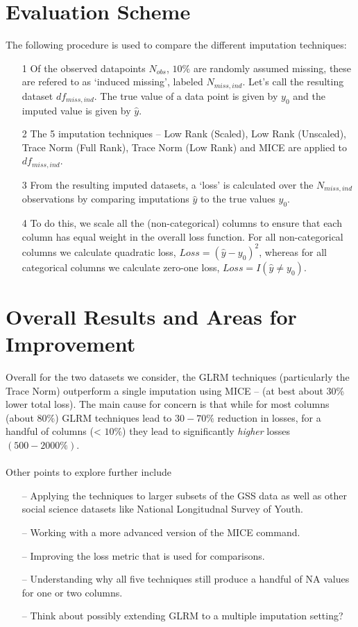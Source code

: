 \documentclass[11pt]{article} %
\begin{document}
\section{Evaluation Scheme}
The following procedure is used to compare the different imputation techniques:
\begin{itemize}
\item[1] Of the observed datapoints $N_{obs}$, $10\%$ are randomly assumed missing, these are refered to as `induced missing', labeled $N_{miss, ind}$. Let's call the resulting dataset $df_{miss, ind}$. The true value of a data point is given by $y_0$ and the imputed value is given by $\widehat{y}$.
\item[2] The 5 imputation techniques --  Low Rank (Scaled), Low Rank (Unscaled), Trace Norm (Full Rank), Trace Norm (Low Rank) and MICE are applied to $df_{miss, ind}$.
\item[3] From the resulting imputed datasets, a `loss' is calculated over the $N_{miss,ind}$ observations by comparing imputations $\widehat{y}$ to the true values $y_0$. 
\item[4] To do this, we scale all the (non-categorical) columns to ensure that each column has equal weight in the overall loss function. For all non-categorical columns we calculate quadratic loss, $Loss = (\widehat{y} - y_0)^2$, whereas for all categorical columns we calculate zero-one loss, $Loss = I (\widehat{y} \neq y_0)$. 
\end{itemize}

\section{Overall Results and Areas for Improvement}
Overall for the two datasets we consider, the GLRM techniques (particularly the Trace Norm) outperform a single imputation using MICE -- (at best about 30\% lower total loss). The main cause for concern is that while for most columns (about $80 \%$) GLRM techniques lead to $30-70 \%$ reduction in losses, for a handful of columns  (< $10 \%$) they lead to significantly \textit{higher} losses $(500-2000\%)$. \\\\
Other points to explore further include 
\begin{itemize}
\item[--] Applying the techniques to larger subsets of the GSS data as well as other social science datasets like National Longitudnal Survey of Youth.
\item[--] Working with a more advanced version of the MICE command. 
\item[--] Improving the loss metric that is used for comparisons. 
\item[--] Understanding why all five techniques still produce a handful of NA values for one or two columns.  
\item[--] Think about possibly extending GLRM to a multiple imputation setting?
\end{itemize}
\end{document}
